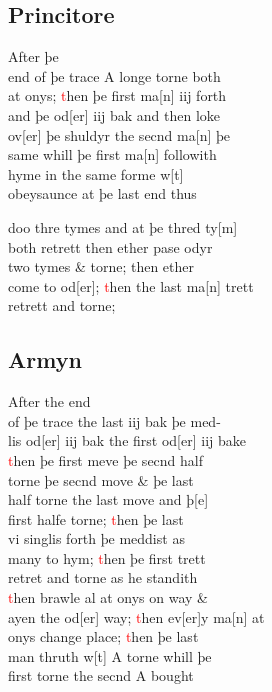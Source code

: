 \documentclass[12pt,letter]{article} %
\newcommand{\red}[1]{\textcolor{red}{#1}}
\newcommand{\srcpg}[1]{
    \noindent{
        \color{Gray}{\rule[0.5ex]{\linewidth}{1pt}~#1} 
        \\
    }
}
\begin{document}
\subsection{Princitore}
After þe\\
end of þe trace A longe torne both\\
at onys; \red{t}hen þe first ma{[}n{]} iij forth\\
and þe od{[}er{]} iij bak and then loke\\
ov{[}er{]} þe shuldyr the secnd ma{[}n{]} þe\\
same whill þe first ma{[}n{]} followith\\
hyme in the same forme w{[}t{]}\\
obeysaunce at þe last end thus \srcpg{61}
doo thre tymes and at þe thred ty{[}m{]}\\
both retrett then ether pase odyr\\
two tymes \& torne; then ether\\
come to od{[}er{]}; \red{t}hen the last ma{[}n{]} trett\\
retrett and torne;

\subsection{Armyn}
After the end\\
of þe trace the last iij bak þe med-\\
lis od{[}er{]} iij bak the first od{[}er{]} iij bake\\
\red{t}hen þe first meve þe secnd half\\
torne þe secnd move \& þe last\\
half torne the last move and þ{[}e{]}\\
first halfe torne; \red{t}hen þe last\\
vi singlis forth þe meddist as\\
many to hym; \red{t}hen þe first trett\\
retret and torne as he standith\\
\red{t}hen brawle al at onys on way \&\\
ayen the od{[}er{]} way; \red{t}hen ev{[}er{]}y ma{[}n{]} at\\
onys change place; \red{t}hen þe last\\
man thruth w{[}t{]} A torne whill þe\\
first torne the secnd A bought
\end{document}
